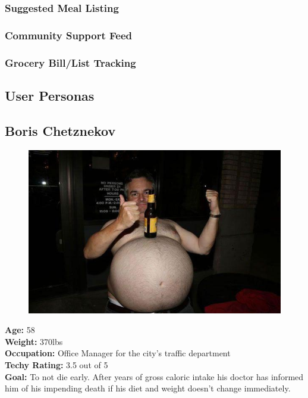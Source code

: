 \documentclass[a4paper,12pt]{article}
\begin{document}
\subsubsection{Suggested Meal Listing}
\subsubsection{Community Support Feed}
\subsubsection{Grocery Bill/List Tracking}

\newpage 
\begin{appendices}
\section{User Personas}
\subsection{Boris Chetznekov}
\begin{figure}
  \begin{center}
	\includegraphics[scale=0.3]{Boris.jpg}\\
  \end{center}
\end{figure}
\textbf{Age:} 58\\
\textbf{Weight:} 370lbs\\
\textbf{Occupation:} Office Manager for the city's traffic department\\
\textbf{Techy Rating:} 3.5 out of 5\\
\textbf{Goal:} To not die early.  After years of gross caloric intake his doctor has informed him of his impending death if his diet and weight doesn't change immediately.\\


\end{appendices}
\end{document}
